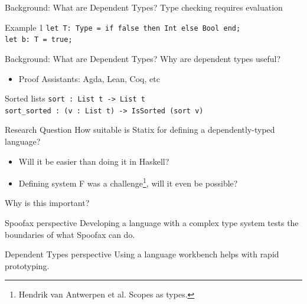 \documentclass[aspectratio=43]{beamer}
\begin{document}
\begin{frame}[fragile]{Background: What are Dependent Types?}
	Type checking requires evaluation
	\begin{exampleblock}{Example 1}
		\texttt{let T: Type = if false then Int else Bool end;\\let b: T = true;}
	\end{exampleblock}
\end{frame}

\begin{frame}[fragile]{Background: What are Dependent Types?}
	Why are dependent types useful?
	\begin{itemize}
		\item Proof Assistants: Agda, Lean, Coq, etc
	\end{itemize}
	
	\begin{exampleblock}{Sorted lists}
\texttt{sort : List t -> List t\\sort\_sorted : (v : List t) -> IsSorted (sort v)}
	\end{exampleblock}
\end{frame}

\begin{frame}[fragile]{Research Question}
\large{How suitable is Statix for defining a dependently-typed language?}
\begin{itemize}
	\item Will it be easier than doing it in Haskell?
	\item Defining system F was a challenge\footnote{Hendrik van Antwerpen et al. Scopes as types.}, will it even be possible?
\end{itemize}

\end{frame}

\begin{frame}[fragile]{Why is this important?}
	\begin{block}{Spoofax perspective}
		Developing a language with a complex type system tests the boundaries of what Spoofax can do.
	\end{block}
	
	\begin{block}{Dependent Types perspective}
		Using a language workbench helps with rapid prototyping.
	\end{block}
\end{frame}
\end{document}
